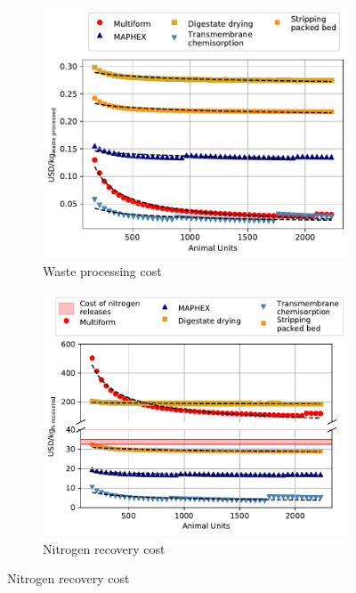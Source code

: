 \begin{refsection}[referencesCh6]

\begin{figure}[h]
	\centering 
	\begin{subfigure}[t]{0.455\textwidth}
		\centering
		\includegraphics[width=1\linewidth, trim={0cm 0cm 0cm 0cm},clip]{gfx/Chapter6/ScaleUp2WasteProcCost.pdf} 
		\caption{Waste processing cost}
		\label{fig:ScaleUp2WasteProcCost}
	\end{subfigure}
	\begin{subfigure}[t]{0.47\textwidth}
		\centering
		\includegraphics[width=1\linewidth, trim={0cm 0cm 0cm 0cm},clip]{gfx/Chapter6/ScaleUp2.pdf} 
		\caption{Nitrogen recovery cost}
		\label{fig:ScaleUp2}
	\end{subfigure}
	

\end{figure}
\end{refsection}
